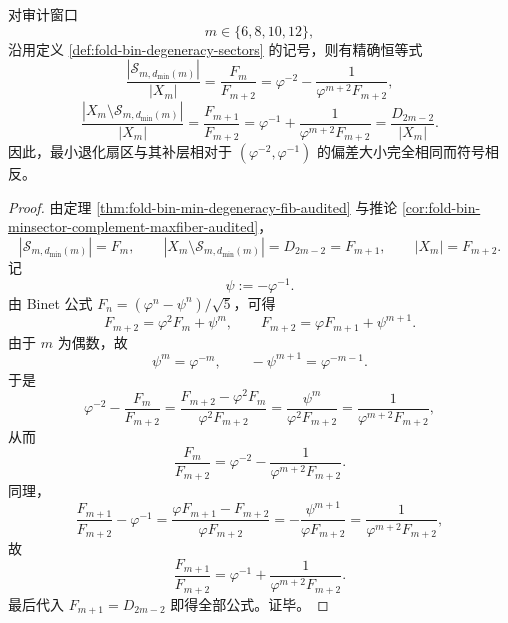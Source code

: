 \begin{theorem}[审计偶数窗最小退化扇区的双边黄金误差律]\label{thm:xi-time-part9y-audited-even-minsector-golden-defect-law}
对审计窗口
\[
m\in\{6,8,10,12\},
\]
沿用定义 \ref{def:fold-bin-degeneracy-sectors} 的记号，则有精确恒等式
\[
\frac{|\mathcal S_{m,d_{\min}(m)}|}{|X_m|}
=
\frac{F_m}{F_{m+2}}
=
\varphi^{-2}-\frac{1}{\varphi^{m+2}F_{m+2}},
\]
\[
\frac{|X_m\setminus \mathcal S_{m,d_{\min}(m)}|}{|X_m|}
=
\frac{F_{m+1}}{F_{m+2}}
=
\varphi^{-1}+\frac{1}{\varphi^{m+2}F_{m+2}}
=
\frac{D_{2m-2}}{|X_m|}.
\]
因此，最小退化扇区与其补层相对于 \((\varphi^{-2},\varphi^{-1})\) 的偏差大小完全相同而符号相反。
\end{theorem}
\begin{proof}
由定理 \ref{thm:fold-bin-min-degeneracy-fib-audited} 与推论 \ref{cor:fold-bin-minsector-complement-maxfiber-audited}，
\[
|\mathcal S_{m,d_{\min}(m)}|=F_m,
\qquad
|X_m\setminus \mathcal S_{m,d_{\min}(m)}|=D_{2m-2}=F_{m+1},
\qquad
|X_m|=F_{m+2}.
\]
记
\[
\psi:=-\varphi^{-1}.
\]
由 Binet 公式 \(F_n=(\varphi^n-\psi^n)/\sqrt5\)，可得
\[
F_{m+2}=\varphi^2F_m+\psi^m,
\qquad
F_{m+2}=\varphi F_{m+1}+\psi^{m+1}.
\]
由于 \(m\) 为偶数，故
\[
\psi^m=\varphi^{-m},
\qquad
-\psi^{m+1}=\varphi^{-m-1}.
\]
于是
\[
\varphi^{-2}-\frac{F_m}{F_{m+2}}
=
\frac{F_{m+2}-\varphi^2F_m}{\varphi^2F_{m+2}}
=
\frac{\psi^m}{\varphi^2F_{m+2}}
=
\frac{1}{\varphi^{m+2}F_{m+2}},
\]
从而
\[
\frac{F_m}{F_{m+2}}
=
\varphi^{-2}-\frac{1}{\varphi^{m+2}F_{m+2}}.
\]
同理，
\[
\frac{F_{m+1}}{F_{m+2}}-\varphi^{-1}
=
\frac{\varphi F_{m+1}-F_{m+2}}{\varphi F_{m+2}}
=
-\frac{\psi^{m+1}}{\varphi F_{m+2}}
=
\frac{1}{\varphi^{m+2}F_{m+2}},
\]
故
\[
\frac{F_{m+1}}{F_{m+2}}
=
\varphi^{-1}+\frac{1}{\varphi^{m+2}F_{m+2}}.
\]
最后代入 \(F_{m+1}=D_{2m-2}\) 即得全部公式。证毕。
\end{proof}

